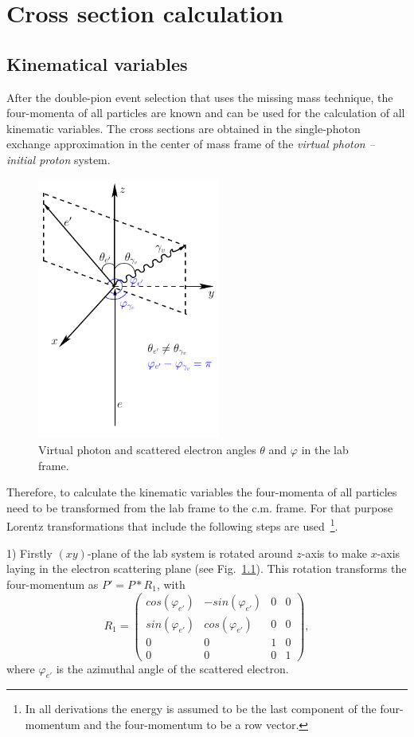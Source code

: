 \chapter{Cross section calculation}

\section{Kinematical variables}
\label{kin_var}

After the double-pion event selection that uses the missing mass technique, the four-momenta of all particles are known and can be used for  the calculation of all  kinematic variables. The cross sections are obtained in the single-photon exchange approximation in the center of mass frame of the {\em virtual photon -- initial proton} system.

\begin{figure}[htp]
\begin{center}
\includegraphics[width=6cm]{pictures/cross_sction/luminosity/electron_angles.pdf}
\caption{\small Virtual photon and scattered electron angles $\theta$ and $\varphi$ in the lab frame.} \label{fig:cr_sec_el_angles}
\end{center}
\end{figure}

Therefore, to calculate the kinematic variables the four-momenta of all particles need to be transformed from the lab frame to the c.m. frame.  For that purpose Lorentz transformations that include the following steps are used~\footnote[1]{In all derivations the energy is assumed to be the last component of the four-momentum and the four-momentum to be a row vector.}.

1) Firstly $(xy)$-plane of the lab system is rotated around $z$-axis to make $x$-axis laying in the electron scattering plane (see Fig.~\ref{fig:cr_sec_el_angles}). This rotation transforms the  four-momentum as $P' = P*R_1$, 
with 
\begin{equation}
R_{1} = \begin{pmatrix}
 cos(\varphi_{e'})& -sin(\varphi_{e'}) & 0 &0 \\ 
 sin(\varphi_{e'})& cos(\varphi_{e'}) &  0& 0\\ 
0 & 0 & 1 &0 \\ 
 0&  0&  0&1 
\end{pmatrix},
\end{equation}
where $\varphi_{e'}$ is the azimuthal angle of the scattered electron.

